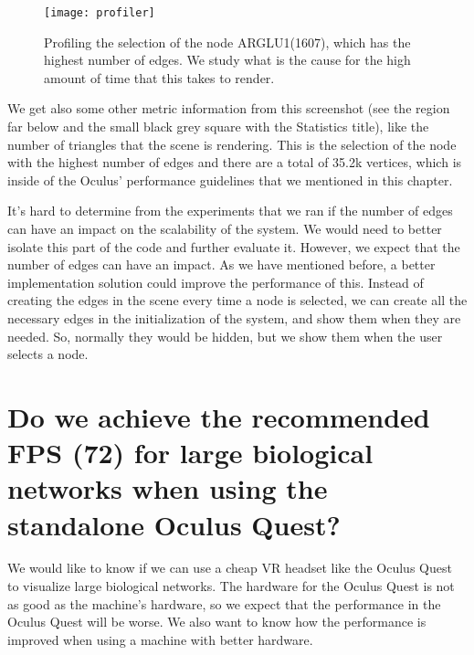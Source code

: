 \begin{figure}
    \centering%
    \texttt{[image: profiler]}
    \caption{Profiling the selection of the node ARGLU1(1607), which has the highest number of edges. We study what is the cause for the high amount of time that this takes to render.}
    \label{fig:profiler}
\end{figure}%

We get also some other metric information from this screenshot (see the region far below and the small black grey square with the Statistics title), like the number of triangles that the scene is rendering. This is the selection of the node with the highest number of edges and there are a total of 35.2k vertices, which is inside of the Oculus' performance guidelines that we mentioned in this chapter.

It's hard to determine from the experiments that we ran if the number of edges can have an impact on the scalability of the system. We would need to better isolate this part of the code and further evaluate it. However, we expect that the number of edges can have an impact. As we have mentioned before, a better implementation solution could improve the performance of this. Instead of creating the edges in the scene every time a node is selected, we can create all the necessary edges in the initialization of the system, and show them when they are needed. So, normally they would be hidden, but we show them when the user selects a node.

%

\section{Do we achieve the recommended FPS (72) for large biological networks when using the standalone Oculus Quest?}
We would like to know if we can use a cheap VR headset like the Oculus Quest to visualize large biological networks. The hardware for the Oculus Quest is not as good as the machine's hardware, so we expect that the performance in the Oculus Quest will be worse. We also want to know how the performance is improved when using a machine with better hardware.

